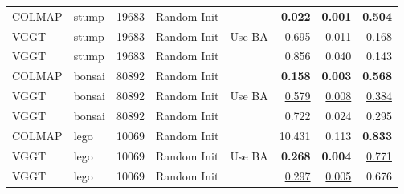 \begin{table}[H]
\begin{tabular}{llrllrrr}
\midrule
COLMAP & stump & 19683 & Random Init &  & \textbf{0.022} & \textbf{0.001} & \textbf{0.504} \\
VGGT & stump & 19683 & Random Init & Use BA & \underline{0.695} & \underline{0.011} & \underline{0.168} \\
VGGT & stump & 19683 & Random Init &  & 0.856 & 0.040 & 0.143 \\
\midrule
COLMAP & bonsai & 80892 & Random Init &  & \textbf{0.158} & \textbf{0.003} & \textbf{0.568} \\
VGGT & bonsai & 80892 & Random Init & Use BA & \underline{0.579} & \underline{0.008} & \underline{0.384} \\
VGGT & bonsai & 80892 & Random Init &  & 0.722 & 0.024 & 0.295 \\
\midrule
COLMAP & lego & 10069 & Random Init &  & 10.431 & 0.113 & \textbf{0.833} \\
VGGT & lego & 10069 & Random Init & Use BA & \textbf{0.268} & \textbf{0.004} & \underline{0.771} \\
VGGT & lego & 10069 & Random Init &  & \underline{0.297} & \underline{0.005} & 0.676 \\
\bottomrule
\end{tabular}
\end{table}